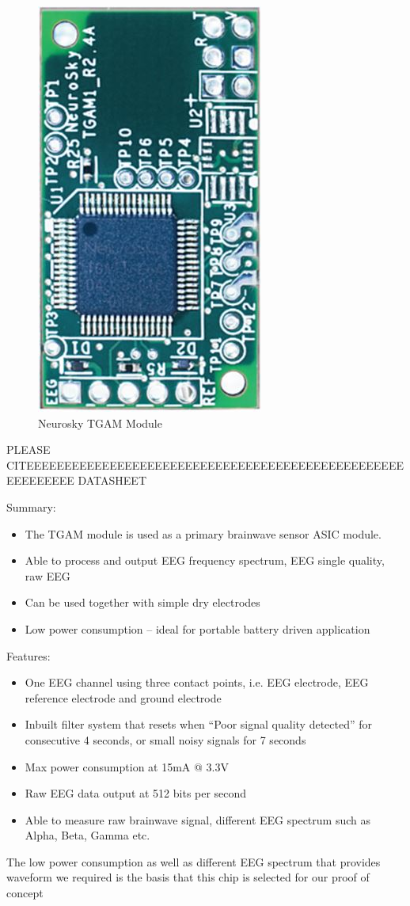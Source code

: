 \begin{figure}[H]
	\centering
	\includegraphics[width=0.3\linewidth,angle=270,origin=c]{jiahuipic2.jpg}
	\caption{Neurosky TGAM Module}
\end{figure}

PLEASE CITEEEEEEEEEEEEEEEEEEEEEEEEEEEEEEEEEEEEEEEEEEEEEEEEEEEEEEEEEEE DATASHEET

Summary:
\begin{itemize}
\item	The TGAM module is used as a primary brainwave sensor ASIC module.
\item	Able to process and output EEG frequency spectrum, EEG single quality, raw EEG 
\item	Can be used together with simple dry electrodes
\item	Low power consumption – ideal for portable battery driven application
\end{itemize}

Features:
\begin{itemize}
\item	One EEG channel using three contact points, i.e. EEG electrode, EEG reference electrode and ground electrode
\item	Inbuilt filter system that resets when “Poor signal quality detected” for consecutive 4 seconds, or small noisy signals for 7 seconds
\item	Max power consumption at 15mA @ 3.3V
\item	Raw EEG data output at 512 bits per second
\item	Able to measure raw brainwave signal, different EEG spectrum such as Alpha, Beta, Gamma etc. 
\end{itemize}

The low power consumption as well as different EEG spectrum that provides waveform we required is the basis that this chip is selected for our proof of concept

